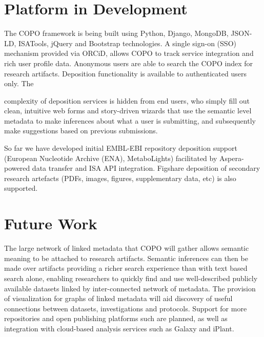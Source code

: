 \documentclass[runningheads,a4paper]{llncs}
\begin{document}
\vspace*{-0.1in}
\section{Platform in Development}


The COPO framework is being built using Python, Django, MongoDB,
JSON-LD, ISATools, jQuery and Bootstrap technologies. A single sign-on (SSO) mechanism provided via ORCiD, allows COPO to track
service integration and rich user profile data. Anonymous users are
able to search the COPO index for research artifacts. Deposition functionality is available to authenticated users only. The

complexity of deposition services is hidden from end users, who simply
fill out clean, intuitive web forms and story-driven wizards that use
the semantic level metadata to make inferences about what a user is
submitting, and subsequently make suggestions based on previous
submissions.


So far we have developed initial EMBL-EBI repository deposition
support (European Nucleotide Archive (ENA), MetaboLights) facilitated
by Aspera-powered data transfer and ISA API integration. Figshare
deposition of secondary research artefacts (PDFs, images, figures,
supplementary data, etc) is also supported.

\vspace*{-0.1in}
\section{Future Work}

The large network of linked metadata that COPO will gather allows
semantic meaning to be attached to research artifacts. Semantic
inferences can then be made over artifacts providing a richer search
experience than with text based search alone, enabling researchers
to quickly find and use well-described publicly available datasets
linked by inter-connected network of metadata. The provision of
visualization for graphs of linked metadata will aid discovery of
useful connections between datasets, investigations and
protocols. Support for more repositories and open publishing platforms
such are planned, as well as integration with cloud-based analysis services such as Galaxy
and iPlant.
\end{document}
